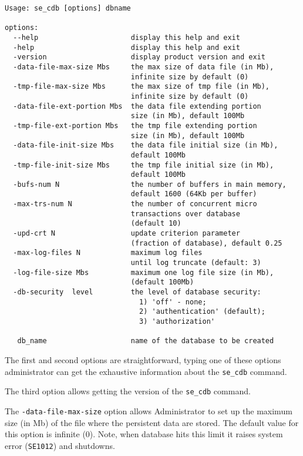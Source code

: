 \documentclass[a4paper,12pt]{article}
\begin{document}
\small{
\begin{verbatim}
Usage: se_cdb [options] dbname

options:
  --help                      display this help and exit
  -help                       display this help and exit
  -version                    display product version and exit
  -data-file-max-size Mbs     the max size of data file (in Mb),
                              infinite size by default (0)
  -tmp-file-max-size Mbs      the max size of tmp file (in Mb), 
                              infinite size by default (0)
  -data-file-ext-portion Mbs  the data file extending portion
                              size (in Mb), default 100Mb
  -tmp-file-ext-portion Mbs   the tmp file extending portion
                              size (in Mb), default 100Mb
  -data-file-init-size Mbs    the data file initial size (in Mb),
                              default 100Mb
  -tmp-file-init-size Mbs     the tmp file initial size (in Mb),
                              default 100Mb
  -bufs-num N                 the number of buffers in main memory,
                              default 1600 (64Kb per buffer)
  -max-trs-num N              the number of concurrent micro
                              transactions over database 
                              (default 10)
  -upd-crt N                  update criterion parameter
                              (fraction of database), default 0.25
  -max-log-files N            maximum log files
                              until log truncate (default: 3)
  -log-file-size Mbs          maximum one log file size (in Mb),
                              (default 100Mb)
  -db-security  level         the level of database security:
                                1) 'off' - none;
                                2) 'authentication' (default);
                                3) 'authorization'

   db_name                    name of the database to be created
\end{verbatim}}

The first and second options are straightforward, typing one of these options
administrator can get the exhaustive information about the \verb!se_cdb!
command.

The third option allows getting the version of the \verb!se_cdb! command.

The \verb!-data-file-max-size! option allows Administrator to set up the maximum
size (in Mb) of the file where the persistent data are stored. The default value
for this option is infinite (0). Note, when database hits this limit it raises
system error (\verb!SE1012!) and shutdowns.
\end{document}
